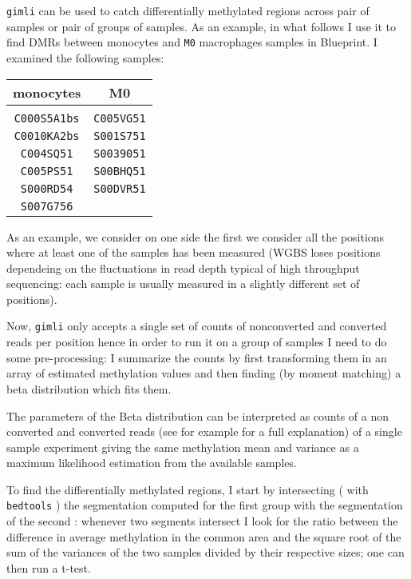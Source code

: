 \documentclass[12pt]{amsart}
\newcommand{\gimli}{\texttt{gimli}}
\begin{document}
\gimli{} can be used to catch differentially methylated regions across pair of samples
or pair of groups of samples.
As an example, in what follows I use it to find DMRs between monocytes and \texttt{M0} macrophages 
samples in Blueprint.  I examined the following samples:

\begin{center}
\begin{tabular}{c|c}
monocytes & M0  \\
\hline \\
\texttt{C000S5A1bs} & \texttt{C005VG51} \\
\texttt{C0010KA2bs} & \texttt{S001S751} \\
\texttt{C004SQ51} & \texttt{S0039051} \\
\texttt{C005PS51} & \texttt{S00BHQ51}\\
\texttt{S000RD54} & \texttt{S00DVR51} \\
\texttt{S007G756} &  \\
\hline
\end{tabular}
\end{center}



As an example, we consider on one side the 
first we consider all the positions where at least one of the samples has been measured
(WGBS loses positions dependeing on the fluctuations in read depth typical of high throughput sequencing: 
each sample is usually measured in a slightly different set of positions).

Now, \gimli{} only accepts a single set of counts of nonconverted and converted reads per position
hence in order to run it on a group of samples I need to do some pre-processing:  I 
summarize the counts by first transforming them in an array of estimated methylation
values and then finding (by moment matching) a beta distribution which fits them.

The parameters of the Beta distribution can be interpreted as counts of 
a non converted and converted reads (see for example \cite{methyldiff} for a full explanation) 
of a single sample experiment giving the same methylation mean 
and variance as a maximum likelihood estimation from the available samples.

To find the differentially methylated regions, I start by intersecting
( with \texttt{bedtools}\cite{bedtools} ) the segmentation computed for the first group
with the segmentation of the second : whenever two segments intersect I look
for the ratio between the difference in average methylation in the common area 
and the square root of the sum of the variances of the two samples divided by their respective
sizes; one can then run a t-test.
\end{document}
